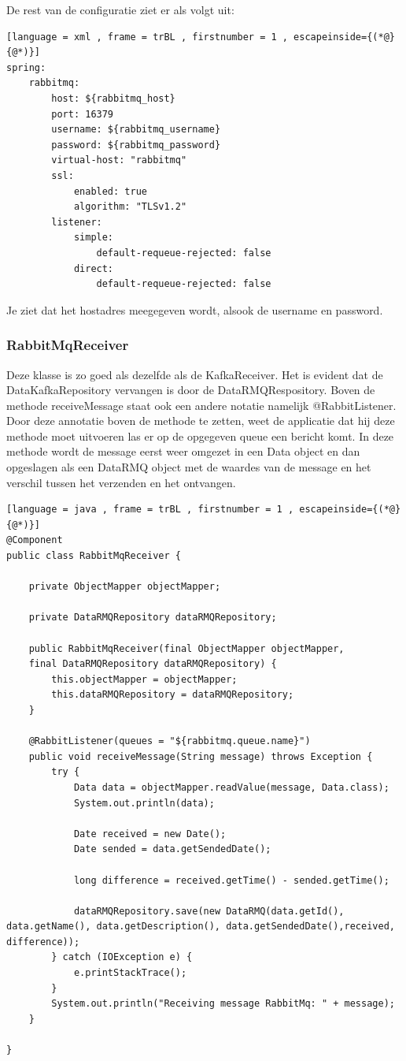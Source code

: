 De rest van de configuratie ziet er als volgt uit: 
\begin{lstlisting}[language = xml , frame = trBL , firstnumber = 1 , escapeinside={(*@}{@*)}]
spring:
    rabbitmq:
        host: ${rabbitmq_host}
        port: 16379
        username: ${rabbitmq_username}
        password: ${rabbitmq_password}
        virtual-host: "rabbitmq"
        ssl:
            enabled: true
            algorithm: "TLSv1.2"
        listener:
            simple:
                default-requeue-rejected: false
            direct:
                default-requeue-rejected: false
\end{lstlisting}

Je ziet dat het hostadres meegegeven wordt, alsook de username en password.
\subsubsection{RabbitMqReceiver}
Deze klasse is zo goed als dezelfde als de KafkaReceiver. Het is evident dat de DataKafkaRepository vervangen is door de DataRMQRespository. Boven de methode receiveMessage staat ook een andere notatie namelijk @RabbitListener. Door deze annotatie boven de methode te zetten, weet de applicatie dat hij deze methode moet uitvoeren las er op de opgegeven queue een bericht komt. In deze methode wordt de message eerst weer omgezet in een Data object en dan opgeslagen als een DataRMQ object met de waardes van de message en het verschil tussen het verzenden en het ontvangen.
\begin{lstlisting}[language = java , frame = trBL , firstnumber = 1 , escapeinside={(*@}{@*)}]
@Component
public class RabbitMqReceiver {
    
    private ObjectMapper objectMapper;
    
    private DataRMQRepository dataRMQRepository;
    
    public RabbitMqReceiver(final ObjectMapper objectMapper,
    final DataRMQRepository dataRMQRepository) {
        this.objectMapper = objectMapper;
        this.dataRMQRepository = dataRMQRepository;
    }
    
    @RabbitListener(queues = "${rabbitmq.queue.name}")
    public void receiveMessage(String message) throws Exception {
        try {
            Data data = objectMapper.readValue(message, Data.class);
            System.out.println(data);
            
            Date received = new Date();
            Date sended = data.getSendedDate();
            
            long difference = received.getTime() - sended.getTime();
            
            dataRMQRepository.save(new DataRMQ(data.getId(), data.getName(), data.getDescription(), data.getSendedDate(),received, difference));
        } catch (IOException e) {
            e.printStackTrace();
        }
        System.out.println("Receiving message RabbitMq: " + message);
    }
   
}
\end{lstlisting}
